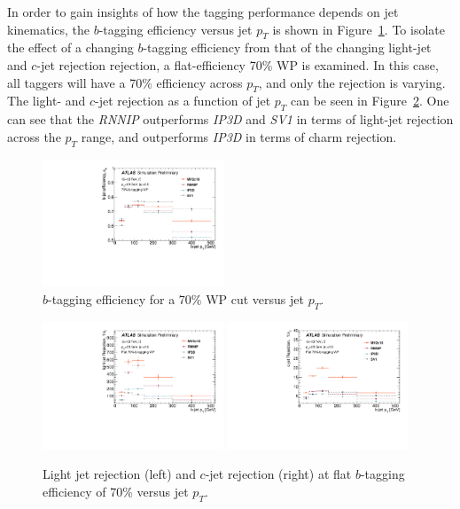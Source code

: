 In order to gain insights of how the tagging performance depends on jet kinematics, the $b$-tagging efficiency versus jet $p_T$ is shown in Figure~\ref{fig:fixed_eff_pt}. To isolate the effect of a changing $b$-tagging efficiency from that of the changing light-jet and $c$-jet rejection rejection, a flat-efficiency 70\% WP is examined.  In this case, all taggers will have a 70\% efficiency across $p_T$, and only the rejection is varying.  The light- and $c$-jet rejection as a function of jet $p_T$ can be seen in Figure~\ref{fig:flat_rej_pt}.  One can see that the \textit{RNNIP} outperforms \textit{IP3D} and \textit{SV1} in terms of light-jet rejection across the $p_T$ range, and outperforms \textit{IP3D} in terms of charm rejection.

\begin{figure}[htbp]
  \centering
 \includegraphics[width=0.48\textwidth]{figures/RNN/BEff_FixWP70.pdf}
\caption{$b$-tagging efficiency for a 70\% WP cut versus jet $p_T$. }
  \label{fig:fixed_eff_pt}
\end{figure}

\begin{figure}[htbp]
  \centering
 \includegraphics[width=0.48\textwidth]{figures/RNN/LRej_FlatEff.pdf}
  \includegraphics[width=0.48\textwidth]{figures/RNN/CRej_FlatEff.pdf}
\caption{Light jet rejection (left) and $c$-jet rejection (right) at flat $b$-tagging efficiency of 70\% versus jet $p_T$.}
  \label{fig:flat_rej_pt}
\end{figure}

